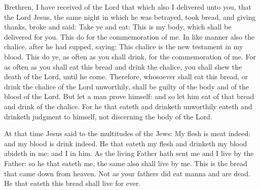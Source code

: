 \bigskip



Brethren, I have received of the Lord that which also I delivered unto you, that the
Lord Jesus, the same night in which he was betrayed, took bread, and giving
thanks, broke and said: Take ye and eat: This is my body, which shall be
delivered for you. This do for the commemoration of me.  In like manner also
the chalice, after he had supped, saying: This chalice is the new testament in
my blood. This do ye, as often as you shall drink, for the commemoration of me.
For as often as you shall eat this bread and drink the chalice, you shall shew
the death of the Lord, until he come.  Therefore, whosoever shall eat this
bread, or drink the chalice of the Lord unworthily, shall be guilty of the body
and of the blood of the Lord.    But let a man prove himself: and so let him eat of that bread and drink
of the chalice.   For he that eateth and drinketh
unworthily eateth and drinketh judgment to himself, not discerning the body of
the Lord.

\bigskip


At that time Jesus said to the multitudes of the Jews:
My flesh is meat indeed: and my blood is drink indeed.  He that eateth my
flesh and drinketh my blood abideth in me: and I in him.  As the living Father
hath sent me and I live by the Father: so he that eateth me, the same also
shall live by me.  This is the bread that came down from heaven. Not as your
fathers did eat manna and are dead. He that eateth this bread shall live for
ever.





